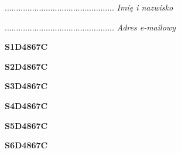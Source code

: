 \begin{turn}{90}\begin{minipage}{\linewidth} \vspace{20mm} ................................................  \textit{Imię i nazwisko}\end{minipage}\end{turn}

\begin{turn}{90}\begin{minipage}{\linewidth} \vspace{20mm} ................................................  \textit{Adres e-mailowy}\end{minipage}\end{turn}

\begin{turn}{90}\huge \begin{minipage}{\linewidth} \vspace{10mm}\textbf{S1D4867C}\end{minipage}\end{turn}

\begin{turn}{90}\huge \begin{minipage}{\linewidth} \vspace{10mm}\textbf{S2D4867C}\end{minipage}\end{turn}

\begin{turn}{90}\huge \begin{minipage}{\linewidth} \vspace{10mm}\textbf{S3D4867C}\end{minipage}\end{turn}

\begin{turn}{90}\huge \begin{minipage}{\linewidth} \vspace{10mm}\textbf{S4D4867C}\end{minipage}\end{turn}

\begin{turn}{90}\huge \begin{minipage}{\linewidth} \vspace{10mm}\textbf{S5D4867C}\end{minipage}\end{turn}

\begin{turn}{90}\huge \begin{minipage}{\linewidth} \vspace{10mm}\textbf{S6D4867C}\end{minipage}\end{turn}

